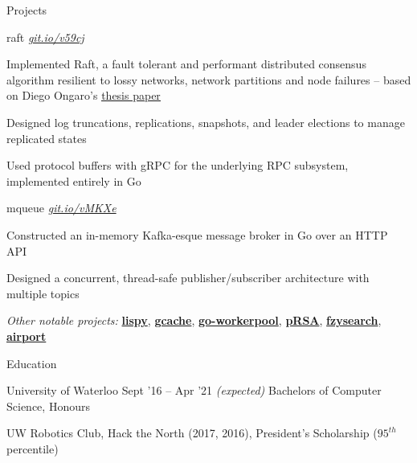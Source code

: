 \documentclass{resume} %
\begin{document}
\begin{rSection}{Projects}
  
  \begin{rSubsection}{raft}
	  {\em {\href{http://github.com/ridwanmsharif/raft}
		    {git.io/v59cj}}}
	  {}

    \item Implemented Raft, a fault tolerant and performant distributed
      consensus algorithm resilient to lossy networks, network partitions and
      node failures -- based on Diego Ongaro's
      \href{https://raft.github.io/raft.pdf}{\underline{thesis paper}}
    \item Designed log truncations, replications, snapshots, and leader
      elections to manage replicated states
    \item Used protocol buffers with gRPC for the underlying RPC subsystem,
      implemented entirely in Go
      
  \end{rSubsection}

  \begin{rSubsection}{mqueue}
	  {\em {\href{http://github.com/ridwanmsharif/mqueue}
		    {git.io/vMKXe}}}
	  {}

    \item Constructed an in-memory Kafka-esque message broker in Go over an HTTP API
    \item Designed a concurrent, thread-safe publisher/subscriber architecture
      with multiple topics
  \end{rSubsection}

  \begin{rMinisection}
    \item {\em Other notable projects:}
      \href{https://github.com/ridwanmsharif/lispy}{\textbf{lispy}},
      \href{https://github.com/ridwanmsharif/cache}{\textbf{gcache}},
      \href{https://github.com/ridwanmsharif/goworkerpool}{\textbf{go-workerpool}},
      \href{https://github.com/ridwanmsharif/prsa}{\textbf{pRSA}},
      \href{https://github.com/ridwanmsharif/fzysearch}{\textbf{fzysearch}},
      \href{https://github.com/ridwanmsharif/airport}{\textbf{airport}}
  \end{rMinisection}
\end{rSection}


\begin{rSection}{Education}
  \begin{rSubsection}{University of Waterloo}
		     {Sept '16 -- Apr '21 \em (expected)}
		     {Bachelors of Computer Science, Honours}
		     {}
    \item UW Robotics Club, Hack the North (2017, 2016), President's Scholarship
      ($95^{th}$ percentile)
  \end{rSubsection}
\end{rSection} 
\end{document}

